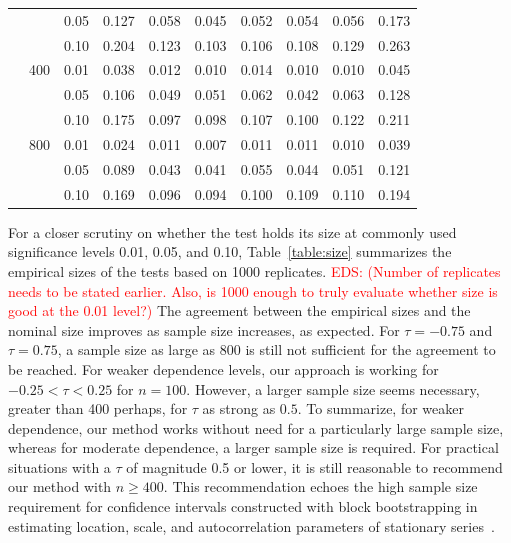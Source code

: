 \documentclass[APA,Times1COL]{WileyNJDv5} %
\newcommand{\eds}[1]{\textcolor{red}{EDS: (#1)}}
\begin{document}
\begin{table}[tbp]
\begin{tabular}{lllrrrrrrr}
  & & 0.05 & 0.127 & 0.058 & 0.045 & 0.052 & 0.054 & 0.056 & 0.173 \\ 
  & & 0.10 & 0.204 & 0.123 & 0.103 & 0.106 & 0.108 & 0.129 & 0.263 \\ 
  & {400} & 0.01 & 0.038 & 0.012 & 0.010 & 0.014 & 0.010 & 0.010 & 0.045 \\ 
  & & 0.05 & 0.106 & 0.049 & 0.051 & 0.062 & 0.042 & 0.063 & 0.128 \\ 
  & & 0.10 & 0.175 & 0.097 & 0.098 & 0.107 & 0.100 & 0.122 & 0.211 \\ 
  & {800} & 0.01 & 0.024 & 0.011 & 0.007 & 0.011 & 0.011 & 0.010 & 0.039 \\ 
  & & 0.05 & 0.089 & 0.043 & 0.041 & 0.055 & 0.044 & 0.051 & 0.121 \\ 
  & & 0.10 & 0.169 & 0.096 & 0.094 & 0.100 & 0.109 & 0.110 & 0.194 \\ 
   \bottomrule
\end{tabular}
\end{table}


For a closer scrutiny on whether the test holds its size at commonly used
significance levels 0.01, 0.05, and 0.10, Table~\ref{table:size}
summarizes the empirical sizes of the tests based on 1000 replicates.
\eds{Number of replicates needs to be stated earlier.  Also, is 1000 enough
to truly evaluate whether size is good at the 0.01 level?}
The agreement between the empirical sizes and the nominal size
improves as sample size increases, as expected. For $\tau = -0.75$
and $\tau = 0.75$, a sample size as large as 800 is still not sufficient for the
agreement to be reached. For weaker dependence levels, our approach is working
for $-0.25 < \tau < 0.25$ for $n = 100$. However, a larger sample size seems 
necessary, greater than 400 perhaps, for $\tau$ as strong as $0.5$. To 
summarize, for weaker dependence, our method works without need for a 
particularly large sample size, whereas for moderate dependence, a larger sample
size is required. For practical situations with a $\tau$ of magnitude 0.5 or
lower, it is still reasonable to recommend our method with $n \ge 400$.
This recommendation echoes the high sample size requirement for
confidence intervals constructed with block bootstrapping in
estimating location, scale, and autocorrelation parameters of
stationary series~\citep{chandy2024sample}.
\end{document}
